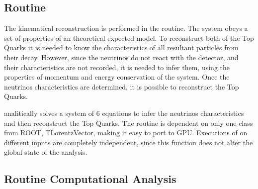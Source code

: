 \subsection{\dilep Routine}
\label{Application:dilep}

The kinematical reconstruction is performed in the \dilep routine. The \ttbar system obeys a set of properties of an theoretical expected model. To reconstruct both of the Top Quarks it is needed to know the characteristics of all resultant particles from their decay. However, since the neutrinos do not react with the detector, and their characteristics are not recorded, it is needed to infer them, using the properties of momentum and energy conservation of the system. Once the neutrinos characteristics are determined, it is possible to reconstruct the Top Quarks.

\dilep analitically solves a system of 6 equations to infer the neutrinos characteristics and then reconstruct the Top Quarks. The routine is dependent on only one class from ROOT, TLorentzVector, making it easy to port to GPU. Executions of \dilep on different inputs are completely independent, since this function does not alter the global state of the \tth analysis.

\subsection{\ttDilepKinFit Routine Computational Analysis}
\label{Application:ttDilepKinFit:Analysis}

